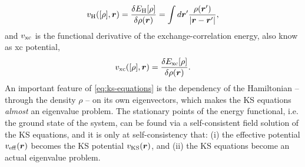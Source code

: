 %
\begin{equation}
    v_{\rm H}([\rho],{\bm r}) = \frac{\delta E_{\rm H}[\rho]}{\delta \rho({\bm r})} = \int d{\bm r}' \frac{\rho({\bm r}')}{|{\bm r} - {\bm r}'|} ,
    \label{eq:hartree-potential}
\end{equation}
%
and $v_{\rm xc}$ is the functional derivative of the exchange-correlation energy, also know as xc potential,
%
\begin{equation}
    v_{\rm xc}([\rho],{\bm r}) = \frac{\delta E_{\rm xc}[\rho]}{\delta \rho({\bm r})} .
    \label{eq:xc-potential}
\end{equation}
%
An important feature of \cref{eq:ks-equations} is the dependency of the Hamiltonian -- through the density $\rho$ -- on its own eigenvectors, which makes the KS equations \emph{almost} an eigenvalue problem. The stationary points of the energy functional, i.e. the ground state of the system, can be found via a self-consistent field solution of the KS equations, and it is only at self-consistency that: (i) the effective potential $v_{\rm eff}({\bm r})$ becomes the KS potential $v_{\rm KS}({\bm r})$, and (ii) the KS equations become an actual eigenvalue problem.

